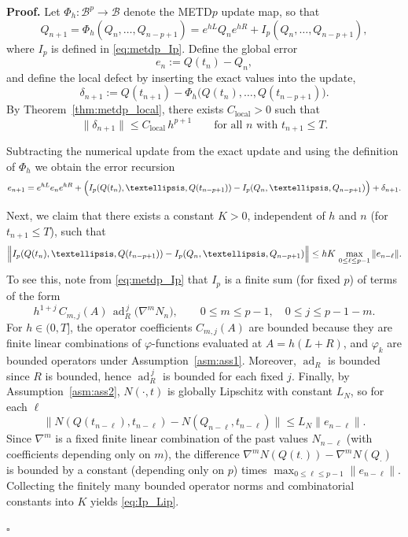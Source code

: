 \documentclass[10pt,a4paper]{amsart}
\DeclareMathOperator{\ad}{ad}
\newenvironment{pf}{\noindent\textbf{Proof.}}{\hfill$\square$}
\begin{document}
\begin{pf}
Let $\Phi_h:\mathcal{B}^p\to\mathcal{B}$ denote the METD$p$ update map, so that
\begin{equation*}
Q_{n+1}=\Phi_h(Q_n,\ldots,Q_{n-p+1})
      = e^{hL}Q_ne^{hR} + I_p(Q_n,\ldots,Q_{n-p+1}),
\end{equation*}
where $I_p$ is defined in \eqref{eq:metdp_Ip}. Define the global error
\begin{equation*}
e_n := Q(t_n)-Q_n,
\end{equation*}
and define the local defect by inserting the exact values into the update,
\begin{equation*}
\delta_{n+1}
:= Q(t_{n+1})-\Phi_h\bigl(Q(t_n),\ldots,Q(t_{n-p+1})\bigr).
\end{equation*}
By Theorem~\ref{thm:metdp_local}, there exists $C_{\mathrm{local}}>0$ such that
\begin{equation}\label{eq:glob_loc_def}
\|\delta_{n+1}\|\le C_{\mathrm{local}}\,h^{p+1}
\qquad\text{for all }n\text{ with }t_{n+1}\le T.
\end{equation}

Subtracting the numerical update from the exact update and using the definition of $\Phi_h$ we obtain the error recursion
\begin{equation}\label{eq:err_decomp}
e_{n+1}
= e^{hL}e_ne^{hR}
+ \Bigl(I_p(Q(t_n),\ldots,Q(t_{n-p+1}))-I_p(Q_n,\ldots,Q_{n-p+1})\Bigr)
+ \delta_{n+1}.
\end{equation}

Next, we claim that there exists a constant $K>0$, independent of $h$ and $n$ (for $t_{n+1}\le T$),
such that
\begin{equation}\label{eq:Ip_Lip}
\Bigl\|I_p(Q(t_n),\ldots,Q(t_{n-p+1}))-I_p(Q_n,\ldots,Q_{n-p+1})\Bigr\|
\le hK\,\max_{0\le \ell\le p-1}\|e_{n-\ell}\|.
\end{equation}
To see this, note from \eqref{eq:metdp_Ip} that $I_p$ is a finite sum (for fixed $p$) of terms of the form
\begin{equation*}
h^{1+j}\,C_{m,j}(A)\,\ad_R^{\,j}\bigl(\nabla^m N_n\bigr),
\qquad 0\le m\le p-1,\quad 0\le j\le p-1-m.
\end{equation*}
For $h\in(0,T]$, the operator coefficients $C_{m,j}(A)$ are bounded because they are finite linear
combinations of $\varphi$-functions evaluated at $A=h(L+R)$, and $\varphi_k$ are bounded operators under
Assumption~\ref{asm:ass1}. Moreover, $\ad_R$ is bounded since $R$ is bounded, hence $\ad_R^{\,j}$ is bounded for each
fixed $j$. Finally, by Assumption~\ref{asm:ass2}, $N(\cdot,t)$ is globally Lipschitz with constant $L_N$, so for each $\ell$
\begin{equation*}
\|N(Q(t_{n-\ell}),t_{n-\ell})-N(Q_{n-\ell},t_{n-\ell})\|\le L_N\|e_{n-\ell}\|.
\end{equation*}
Since $\nabla^m$ is a fixed finite linear combination of the past values $N_{n-\ell}$ (with coefficients depending only on $m$),
the difference $\nabla^m N(Q(t_\cdot))-\nabla^m N(Q_\cdot)$ is bounded by a constant (depending only on $p$) times
$\max_{0\le\ell\le p-1}\|e_{n-\ell}\|$. Collecting the finitely many bounded operator norms and combinatorial constants into $K$
yields \eqref{eq:Ip_Lip}.


\end{pf}
\end{document}
